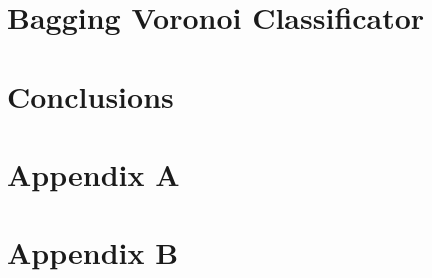 \documentclass{Configuration_Files/PoliMi3i_thesis}
\begin{document}
\chapter{Bagging Voronoi Classificator}
\label{ch:baggingvoronoi}



\chapter{Conclusions}
\label{ch:conclusions}



{\scriptsize }


\cleardoublepage
{} %
\appendix

\chapter{Appendix A}
\label{ap:research}


\chapter{Appendix B}
\label{ap:Python}%


\cleardoublepage
\end{document}
